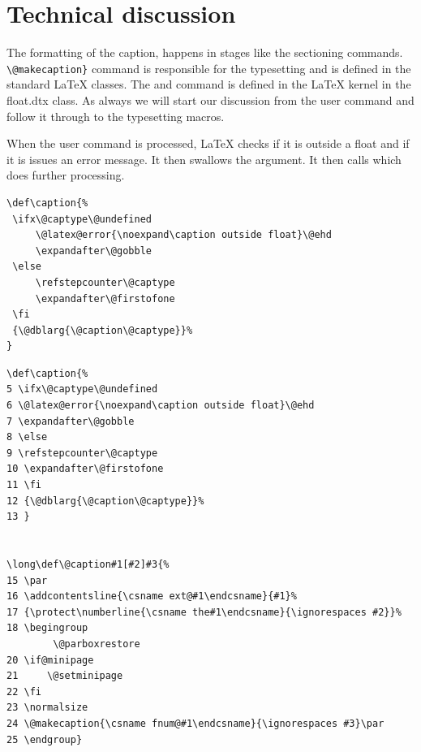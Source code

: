 

\def\captionlabelfont@cx{bf}




\captionsetup[figure]{font=\captionlabelfont@cx}


\section{Technical discussion}

The formatting of the caption, happens in stages like the sectioning commands.  \lstinline+\@makecaption}+  command is responsible for the typesetting and is defined in the standard LaTeX classes. The  and command is defined in the LaTeX kernel in the float.dtx class. As always we will start our discussion from the user command and follow it through to the typesetting macros.

When the user command  is processed, LaTeX checks if it is outside a float and if it is issues an error message. It then swallows the argument. It then calls  which does further processing.

\begin{tcolorbox}
\begin{lstlisting}
\def\caption{%
 \ifx\@captype\@undefined
     \@latex@error{\noexpand\caption outside float}\@ehd
     \expandafter\@gobble
 \else
     \refstepcounter\@captype
     \expandafter\@firstofone
 \fi
 {\@dblarg{\@caption\@captype}}%
}
\end{lstlisting}
\end{tcolorbox}

\begin{lstlisting}
\def\caption{%
5 \ifx\@captype\@undefined
6 \@latex@error{\noexpand\caption outside float}\@ehd
7 \expandafter\@gobble
8 \else
9 \refstepcounter\@captype
10 \expandafter\@firstofone
11 \fi
12 {\@dblarg{\@caption\@captype}}%
13 }


\long\def\@caption#1[#2]#3{%
15 \par
16 \addcontentsline{\csname ext@#1\endcsname}{#1}%
17 {\protect\numberline{\csname the#1\endcsname}{\ignorespaces #2}}%
18 \begingroup
        \@parboxrestore
20 \if@minipage
21     \@setminipage
22 \fi
23 \normalsize
24 \@makecaption{\csname fnum@#1\endcsname}{\ignorespaces #3}\par
25 \endgroup}
\end{lstlisting}



